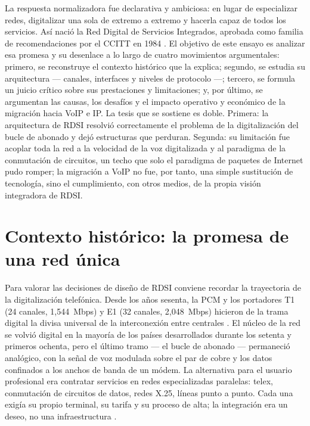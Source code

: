 \documentclass[12pt,a4paper]{article}
\begin{document}
La respuesta normalizadora fue declarativa y ambiciosa: en lugar de especializar redes, digitalizar una sola de extremo a extremo y hacerla capaz de todos los servicios. Así nació la Red Digital de Servicios Integrados, aprobada como familia de recomendaciones por el CCITT en 1984 \cite{itui120}. El objetivo de este ensayo es analizar esa promesa y su desenlace a lo largo de cuatro movimientos argumentales: primero, se reconstruye el contexto histórico que la explica; segundo, se estudia su arquitectura --- canales, interfaces y niveles de protocolo ---; tercero, se formula un juicio crítico sobre sus prestaciones y limitaciones; y, por último, se argumentan las causas, los desafíos y el impacto operativo y económico de la migración hacia VoIP e IP. La tesis que se sostiene es doble. Primera: la arquitectura de RDSI resolvió correctamente el problema de la digitalización del bucle de abonado y dejó estructuras que perduran. Segunda: su limitación fue acoplar toda la red a la velocidad de la voz digitalizada y al paradigma de la conmutación de circuitos, un techo que solo el paradigma de paquetes de Internet pudo romper; la migración a VoIP no fue, por tanto, una simple sustitución de tecnología, sino el cumplimiento, con otros medios, de la propia visión integradora de RDSI.

\section{Contexto histórico: la promesa de una red única}

Para valorar las decisiones de diseño de RDSI conviene recordar la trayectoria de la digitalización telefónica. Desde los años sesenta, la PCM y los portadores T1 (24 canales, 1,544~Mbps) y E1 (32 canales, 2,048~Mbps) hicieron de la trama digital la divisa universal de la interconexión entre centrales \cite{schwartz1987}. El núcleo de la red se volvió digital en la mayoría de los países desarrollados durante los setenta y primeros ochenta, pero el último tramo --- el bucle de abonado --- permaneció analógico, con la señal de voz modulada sobre el par de cobre y los datos confinados a los anchos de banda de un módem. La alternativa para el usuario profesional era contratar servicios en redes especializadas paralelas: telex, conmutación de circuitos de datos, redes X.25, líneas punto a punto. Cada una exigía su propio terminal, su tarifa y su proceso de alta; la integración era un deseo, no una infraestructura \cite{stallings1999}.
\end{document}
